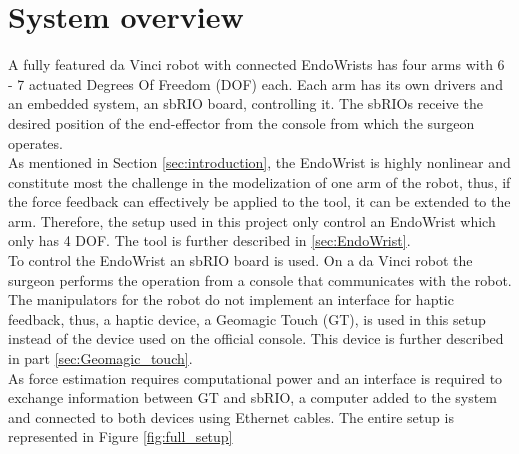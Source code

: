 \section{System overview}\label{sec:system_overview}
{\color{green}
A fully featured da Vinci robot with connected EndoWrists has four arms with 6 - 7 actuated Degrees Of Freedom (DOF) each. Each arm has its own drivers and an embedded system, an sbRIO board, controlling it. The sbRIOs receive the desired position of the end-effector from the console from which the surgeon operates.\\
As mentioned in Section \ref{sec:introduction}, the EndoWrist is highly nonlinear and constitute most the challenge in the modelization of one arm of the robot, thus, if the force feedback can effectively be applied to the tool, it can be extended to the arm. Therefore, the setup used in this project only control an EndoWrist which only has 4 DOF. The tool is further described in \ref{sec:EndoWrist}. \color{red}{As each arm is independent, the system designed for one arm can be extended to the full robot. This paper will focus on implementing a force feedback on one EndoWrist.} \\ 
To control the EndoWrist an sbRIO board is used. On a da Vinci robot the surgeon performs the operation from a console that communicates with the robot. The manipulators for the robot do not implement an interface for haptic feedback, thus, a haptic device, a Geomagic Touch (GT), is used in this setup instead of the device used on the official console. This device is further described in part \ref{sec:Geomagic_touch}.\\
As force estimation requires computational power and an interface is required to exchange information between GT and sbRIO, a computer added to the system and connected to both devices using Ethernet cables. The entire setup is represented in Figure \ref{fig:full_setup}
\begin{figure}[h]
\centering
{}
\end{figure}}
